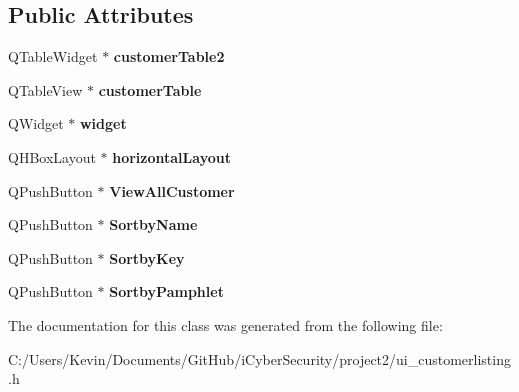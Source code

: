 \subsection*{Public Attributes}
\begin{DoxyCompactItemize}
\item 
\mbox{\label{class_ui__customer_listing_a3099c0d6cb377cea7162dcb83dc9b367}} 
Q\+Table\+Widget $\ast$ {\bfseries customer\+Table2}
\item 
\mbox{\label{class_ui__customer_listing_a7f1118df4279405418bc8315b723c5a8}} 
Q\+Table\+View $\ast$ {\bfseries customer\+Table}
\item 
\mbox{\label{class_ui__customer_listing_a2e0b51ea96979e2703d76a46d0c31d89}} 
Q\+Widget $\ast$ {\bfseries widget}
\item 
\mbox{\label{class_ui__customer_listing_acbf129d332991405257dddef2ff95b60}} 
Q\+H\+Box\+Layout $\ast$ {\bfseries horizontal\+Layout}
\item 
\mbox{\label{class_ui__customer_listing_a4b1909055e76fd455b5ce7036dd9293d}} 
Q\+Push\+Button $\ast$ {\bfseries View\+All\+Customer}
\item 
\mbox{\label{class_ui__customer_listing_a30baffe9fe7b34adceab714d7345a7b6}} 
Q\+Push\+Button $\ast$ {\bfseries Sortby\+Name}
\item 
\mbox{\label{class_ui__customer_listing_aacd8bf39448730821f9a7fc2ba383424}} 
Q\+Push\+Button $\ast$ {\bfseries Sortby\+Key}
\item 
\mbox{\label{class_ui__customer_listing_a5a05b551507a3c922e6364f0a89ba87f}} 
Q\+Push\+Button $\ast$ {\bfseries Sortby\+Pamphlet}
\end{DoxyCompactItemize}


The documentation for this class was generated from the following file\+:\begin{DoxyCompactItemize}
\item 
C\+:/\+Users/\+Kevin/\+Documents/\+Git\+Hub/i\+Cyber\+Security/project2/ui\+\_\+customerlisting.\+h\end{DoxyCompactItemize}
